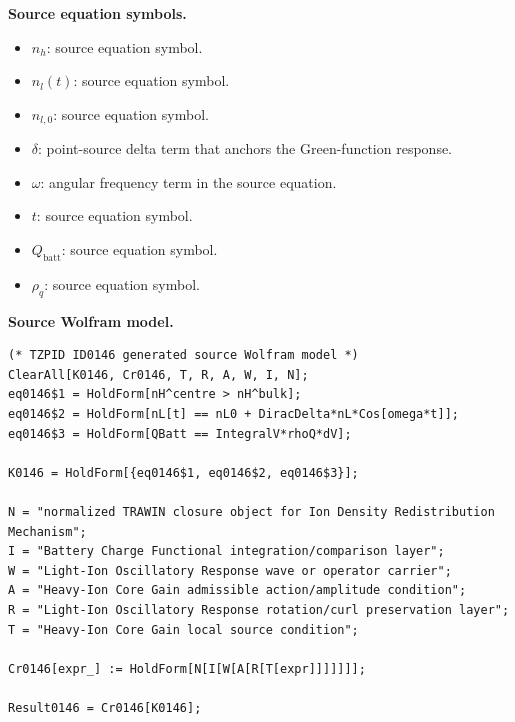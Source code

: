 \begin{minipage}[t]{0.49\linewidth}
\begingroup
\small
\raggedright
\textbf{Source equation symbols.}\par
\begin{itemize}[leftmargin=1.35em,itemsep=1pt,topsep=1pt,parsep=0pt]
    \item $n_h$: source equation symbol.
    \item $n_l(t)$: source equation symbol.
    \item $n_{l,0}$: source equation symbol.
    \item $\delta$: point-source delta term that anchors the Green-function response.
    \item $\omega$: angular frequency term in the source equation.
    \item $t$: source equation symbol.
    \item $Q_{\mathrm{batt}}$: source equation symbol.
    \item $\rho_q$: source equation symbol.
\end{itemize}
\endgroup
\end{minipage}\hfill
\begin{minipage}[t]{0.47\linewidth}
\begingroup
\scriptsize
\raggedright
\textbf{Source Wolfram model.}\par
\begin{Verbatim}[fontsize=\tiny,breaklines=true,breakanywhere=true]
(* TZPID ID0146 generated source Wolfram model *)
ClearAll[K0146, Cr0146, T, R, A, W, I, N];
eq0146$1 = HoldForm[nH^centre > nH^bulk];
eq0146$2 = HoldForm[nL[t] == nL0 + DiracDelta*nL*Cos[omega*t]];
eq0146$3 = HoldForm[QBatt == IntegralV*rhoQ*dV];

K0146 = HoldForm[{eq0146$1, eq0146$2, eq0146$3}];

N = "normalized TRAWIN closure object for Ion Density Redistribution Mechanism";
I = "Battery Charge Functional integration/comparison layer";
W = "Light-Ion Oscillatory Response wave or operator carrier";
A = "Heavy-Ion Core Gain admissible action/amplitude condition";
R = "Light-Ion Oscillatory Response rotation/curl preservation layer";
T = "Heavy-Ion Core Gain local source condition";

Cr0146[expr_] := HoldForm[N[I[W[A[R[T[expr]]]]]]];

Result0146 = Cr0146[K0146];
\end{Verbatim}
\endgroup
\end{minipage}

